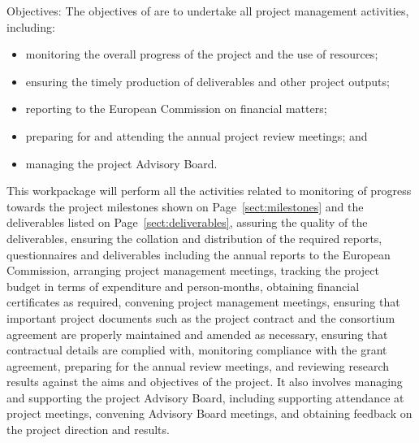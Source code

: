 \addtocounter{wpno}{1}

\begin{Workpackage}{\thewpno}
\WPTitle{\wpname{\thewpno}}

\begin{WPObjectives}
  Objectives: The objectives of \theWP{} are to undertake all project
  management activities, including:
  \begin{itemize}
  \item monitoring the overall progress of the project and the use of
    resources;
  \item ensuring the timely production of deliverables and other
    project outputs;
  \item reporting to the European Commission on financial matters;
  \item preparing for and attending the annual project review
    meetings; and
  \item managing the project Advisory Board.
  \end{itemize}

\end{WPObjectives}

\begin{WPDescription}
  This workpackage will perform all the activities related to
  monitoring of progress towards the project milestones shown on
  Page~\ref{sect:milestones} and the deliverables listed on
  Page~\ref{sect:deliverables}, assuring the quality of the
  deliverables, ensuring the collation and distribution of the
  required reports, questionnaires and deliverables including the
  annual reports to the European Commission, arranging project
  management meetings, tracking the project budget in terms of
  expenditure and person-months, obtaining financial certificates as
  required, convening project management meetings, ensuring that
  important project documents such as the project contract and the
  consortium agreement are properly maintained and amended as
  necessary, ensuring that contractual details are complied with,
  monitoring compliance with the grant agreement, preparing for the
  annual review meetings, and reviewing research results against the
  aims and objectives of the project. It also involves managing and
  supporting the project Advisory Board, including supporting
  attendance at project meetings, convening Advisory Board meetings,
  and obtaining feedback on the project direction and results.


\end{WPDescription}
\end{Workpackage}
